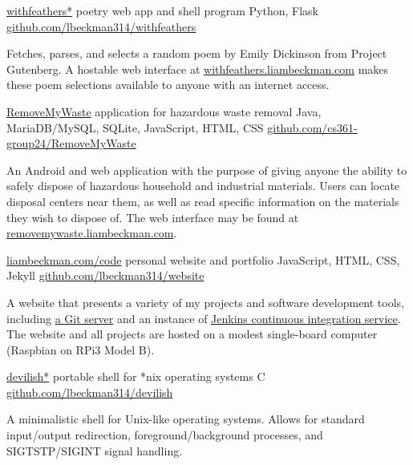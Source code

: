 \medbreak



\showoff
{\href{https://withfeathers.liambeckman.com}{withfeathers*}}
{poetry web app and shell program}
{Python, Flask}
{\href{https://github.com/lbeckman314/withfeathers}{github.com/lbeckman314/withfeathers}}

Fetches, parses, and selects a random poem by Emily Dickinson from Project Gutenberg. A hostable web interface at \textcolor{my-blue}{\href{https://withfeathers.liambeckman.com}{withfeathers.liambeckman.com}} makes these poem selections available to anyone with an internet access.

\myBreak

\showoff
{\href{https://liambeckman.com/code/matriz}{RemoveMyWaste}}
{application for hazardous waste removal}
{Java, MariaDB/MySQL, SQLite, JavaScript, HTML, CSS}
{\href{https://github.com/cs361-group24/RemoveMyWaste}{github.com/cs361-group24/RemoveMyWaste}}

An Android and web application with the purpose of giving anyone the ability to safely dispose of hazardous household and industrial materials. Users can locate disposal centers near them, as well as read specific information on the materials they wish to dispose of. The web interface may be found at \textcolor{my-blue}{\href{https://removemywaste.liambeckman.com}{removemywaste.liambeckman.com}}.

\myBreak

\showoff
{\href{https://liambeckman.com}{liambeckman.com/code}}
{personal website and portfolio}
{JavaScript, HTML, CSS, Jekyll}
{\href{https://github.com/lbeckman314/website}{github.com/lbeckman314/website}}

A website that presents a variety of my projects and software development tools, including \href{https://git.liambeckman.com}{a Git server} and an instance of \href{https://liambeckman.com/jenkins}{Jenkins continuous integration service}. The website and all projects are hosted on a modest single-board computer (Raspbian on RPi3 Model B).

\myBreak

\showoff
{\href{https://liambeckman.com/code/devilish}{devilish*}}
{portable shell for *nix operating systems}
{C}
{\href{https://github.com/lbeckman314/devilish}{github.com/lbeckman314/devilish}}

A minimalistic shell for Unix-like operating systems. Allows for standard input/output redirection, foreground/background processes, and SIGTSTP/SIGINT signal handling.

